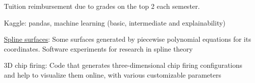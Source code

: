 \documentclass[]{plushcv}
\begin{document}
\begin{minipage}[t]{0.70\textwidth}
\begin{tightemize}
\item Tuition reimbursement due to grades on the top 2 each semester.\\
\end{tightemize}


\location{}
\begin{tightemize}
\item Kaggle: pandas, machine learning (basic, intermediate and explainability)
\end{tightemize}


\sectionsep
{}
\location{}
\begin{tightemize}
\sectionsep
\item  \href{https://emersonjleon.pythonanywhere.com/visualization}{Spline surfaces}: Some surfaces generated by piecewise polynomial equations for its coordinates. Software experiments for research in spline theory  


\item 3D chip firing: Code that generates three-dimensional chip firing configurations and help to visualize them online, with various customizable parameters  
\end{tightemize}



%
%

\end{minipage} 
\end{document}
